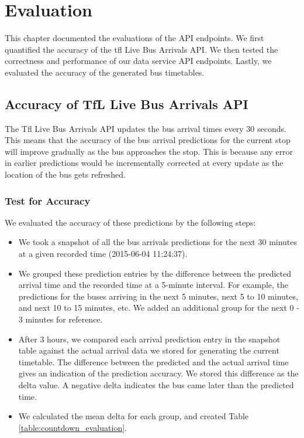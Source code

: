 \chapter{Evaluation}
\label{ch:evaluation}
\par This chapter documented the evaluations of the API endpoints. We first quantified the accuracy of the \acrshort{tfl} Live Bus Arrivals API. We then tested the correctness and performance of our data service API endpoints. Lastly, we evaluated the accuracy of the generated bus timetables.

\section{Accuracy of TfL Live Bus Arrivals API}
\label{sec:tfl_stream_accuracy}
\par The Tfl Live Bus Arrivals API updates the bus arrival times every 30 seconds. This means that the accuracy of the bus arrival predictions for the current stop will improve gradually as the bus approaches the stop. This is because any error in earlier predictions would be incrementally corrected at every update as the location of the bus gets refreshed.

\subsection{Test for Accuracy}
\par We evaluated the accuracy of these predictions by the following steps:

\begin{itemize}
  \item We took a snapshot of all the bus arrivals predictions for the next 30 minutes at a given recorded time (2015-06-04 11:24:37).
  \item We grouped these prediction entries by the difference between the predicted arrival time and the recorded time at a 5-minute interval. For example, the predictions for the buses arriving in the next 5 minutes, next 5 to 10 minutes, and next 10 to 15 minutes, etc. We added an additional group for the next 0 - 3 minutes for reference.
  \item After 3 hours, we compared each arrival prediction entry in the snapshot table against the actual arrival data we stored for generating the current timetable. The difference between the predicted and the actual arrival time gives an indication of the prediction accuracy. We stored this difference as the delta value. A negative delta indicates the bus came later than the predicted time.
  \item We calculated the mean delta for each group, and created Table \ref{table:countdown_evaluation}.
\end{itemize}

